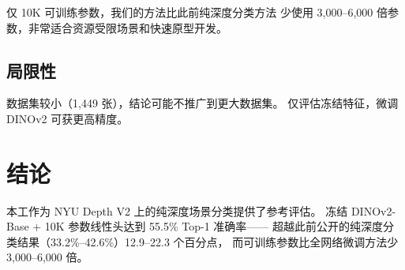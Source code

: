 \documentclass[conference, a4paper]{IEEEtran}
\begin{document}
仅 10K 可训练参数，我们的方法比此前纯深度分类方法
少使用 3,000--6,000 倍参数，非常适合资源受限场景和快速原型开发。

\subsection{局限性}

数据集较小（1,449 张），结论可能不推广到更大数据集。
仅评估冻结特征，微调 DINOv2 可获更高精度。

\section{结论}

本工作为 NYU Depth V2 上的纯深度场景分类提供了参考评估。
冻结 DINOv2-Base + 10K 参数线性头达到 55.5\% Top-1 准确率——
超越此前公开的纯深度分类结果（33.2\%--42.6\%）12.9--22.3 个百分点，
而可训练参数比全网络微调方法少 3,000--6,000 倍。
\end{document}
